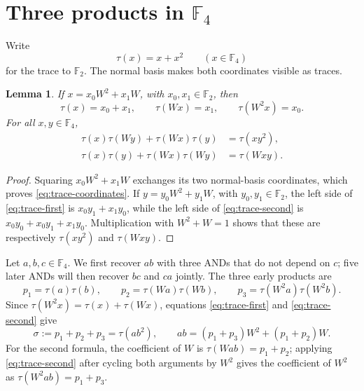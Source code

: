 \documentclass[11pt]{article}
\newtheorem{lemma}[theorem]{Lemma}
\newcommand{\F}{\mathbb F}
\begin{document}
\section{Three products in \texorpdfstring{\(\F_4\)}{F4}}

Write
\[
 \tau(x)=x+x^2\qquad(x\in\F_4)
\]
for the trace to \(\F_2\).  The normal basis makes both coordinates
visible as traces.

\begin{lemma}\label{lem:trace-identities}
If \(x=x_0W^2+x_1W\), with \(x_0,x_1\in\F_2\), then
\begin{equation}\label{eq:trace-coordinates}
 \tau(x)=x_0+x_1,\qquad \tau(Wx)=x_1,\qquad
 \tau(W^2x)=x_0.
\end{equation}
For all \(x,y\in\F_4\),
\begin{align}
 \tau(x)\tau(Wy)+\tau(Wx)\tau(y)&=\tau(xy^2),
 \label{eq:trace-first}\\
 \tau(x)\tau(y)+\tau(Wx)\tau(Wy)&=\tau(Wxy).
 \label{eq:trace-second}
\end{align}
\end{lemma}

\begin{proof}
Squaring \(x_0W^2+x_1W\) exchanges its two normal-basis coordinates,
which proves \eqref{eq:trace-coordinates}.  If
\(y=y_0W^2+y_1W\), with \(y_0,y_1\in\F_2\), the left side of
\eqref{eq:trace-first} is
\(x_0y_1+x_1y_0\), while the left side of
\eqref{eq:trace-second} is
\(x_0y_0+x_0y_1+x_1y_0\).  Multiplication with \(W^2+W=1\) shows that
these are respectively \(\tau(xy^2)\) and \(\tau(Wxy)\).
\end{proof}

Let \(a,b,c\in\F_4\).  We first recover \(ab\) with three ANDs that do
not depend on \(c\); five later ANDs will then recover \(bc\) and \(ca\)
jointly.  The three early products are
\begin{equation}\label{eq:early-products}
 p_1=\tau(a)\tau(b),\qquad
 p_2=\tau(Wa)\tau(Wb),\qquad
 p_3=\tau(W^2a)\tau(W^2b).
\end{equation}
Since \(\tau(W^2x)=\tau(x)+\tau(Wx)\), equations
\eqref{eq:trace-first} and \eqref{eq:trace-second} give
\begin{equation}\label{eq:sigma-ab}
 \sigma:=p_1+p_2+p_3=\tau(ab^2),\qquad
 ab=(p_1+p_3)W^2+(p_1+p_2)W.
\end{equation}
For the second formula, the coefficient of \(W\) is
\(\tau(Wab)=p_1+p_2\); applying \eqref{eq:trace-second} after cycling
both arguments by \(W^2\) gives the coefficient of \(W^2\) as
\(\tau(W^2ab)=p_1+p_3\).
\end{document}
